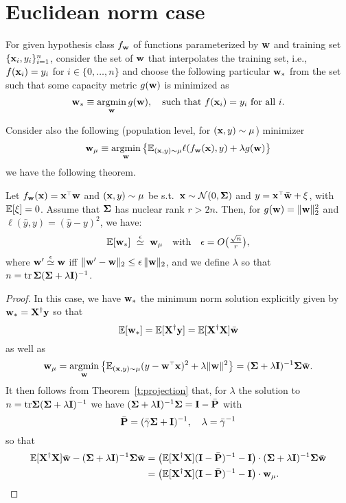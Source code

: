 \documentclass[11pt]{article}
\begin{document}
\section{Euclidean norm case}

For given hypothesis class $f_\mathbf w$ of functions parameterized by $\mathbf w$ and training set $\{ \mathbf x_i, y_i \}_{i=1}^n$, consider the set of $\mathbf w$ that interpolates the training set, i.e., $f(\mathbf x_i) = y_i$ for $i \in \{0, \ldots, n\}$ and choose the following particular $\mathbf w_*$ from the set such that some capacity metric $g(\mathbf w)$ is minimized as
\[
  \mathbf w_* \equiv \operatorname*{\mathop{\mathrm{argmin}}}_\mathbf w g(\mathbf w), \quad \textmd{such that $f(\mathbf x_i) = y_i$ for all $i$}.
\]

Consider also the following (population level, for $(\mathbf x, y) \sim \mu$) minimizer
\[
  \mathbf w_\mu \equiv \operatorname*{\mathop{\mathrm{argmin}}}_\mathbf w \left\{ \mathbb E_{(\mathbf x,y) \sim \mu} \ell(f_\mathbf w(\mathbf x), y) + \lambda g(\mathbf w) \right\}
\]
we have the following theorem.

\begin{theorem}\label{t:main-Eulidean}
Let $f_\w(\x)=\x^\top\w$ and $(\mathbf x,y)\sim\mu$
  be s.t.~$\mathbf x\sim\mathcal{N}(0,\mathbf{\Sigma})$ and $y=\x^\top \bar \w+\xi$,
  with $\mathbb E[\xi]=0$. Assume that $\mathbf{\Sigma}$ has nuclear rank
  $r>2n$. Then, for $g(\mathbf w)=\|\mathbf w\|_2^2$
  and $\ell(\hat y, y)=(\hat y-y)^2$, we have:
  \begin{align*}
    \mathbb E [\mathbf w_*]
   \ \overset{\epsilon}{\simeq}\ \mathbf w_\mu
\quad    \text{with}\quad\epsilon = O\big(\tfrac{\sqrt n}r\big),
  \end{align*}
  where $\mathbf w'\overset\epsilon\simeq\mathbf w$ iff
  $\|\mathbf w'-\mathbf w\|_2\leq \epsilon\,\|\mathbf w\|_2$, and we define $\lambda$ so that $n=\mathrm{tr}\,\mathbf{\Sigma}(\mathbf{\Sigma}+\lambda\mathbf I)^{-1}$.
\end{theorem}
\begin{proof}
In this case, we have $\mathbf w_*$ the minimum norm solution explicitly given by $\mathbf w_* = \mathbf X^\dagger \mathbf y$ so that
\[
  \mathbb E [\mathbf w_*]= \mathbb E[\mathbf X^\dagger \mathbf y] = \mathbb E[\mathbf X^\dagger \mathbf X] \bar {\mathbf w}
\]
as well as
\[
  \w_\mu = \argmin_\w \left\{ \E_{(\x,y) \sim \mu} (y - \w^\top \x)^2 + \lambda \| \w \|^2 \right\} = (\Sigmab + \lambda \I)^{-1} \Sigmab \bar \w.
\]
It then follows from Theorem~\ref{t:projection} that, for $\lambda$ the solution to $n = \mathrm{tr} \mathbf{\Sigma} (\mathbf{\Sigma} + \lambda \mathbf I)^{-1}$ we have $ (\mathbf{\Sigma} + \lambda \mathbf I)^{-1} \mathbf{\Sigma} = \mathbf I - \bar {\mathbf P} $ with
\[
  \bar {\mathbf P} = (\bar \gamma \mathbf{\Sigma} + \mathbf I)^{-1}, \quad \lambda = \bar \gamma^{-1}
\]
so that
\begin{align*}
  \mathbb E[\mathbf X^\dagger \mathbf X] \bar {\mathbf w} - (\mathbf{\Sigma} + \lambda \mathbf I)^{-1} \mathbf{\Sigma} \bar {\mathbf w} &= \left( \mathbb E[\mathbf X^\dagger \mathbf X] (\mathbf I - \bar {\mathbf P})^{-1} - \mathbf I  \right)  \cdot (\mathbf{\Sigma} + \lambda \mathbf I)^{-1} \mathbf{\Sigma} \bar {\mathbf w} \\
  &= \left( \mathbb E[\mathbf X^\dagger \mathbf X] (\mathbf I - \bar {\mathbf P})^{-1} - \mathbf I  \right) \cdot \mathbf w_\mu.
\end{align*}
\end{proof}
\end{document}

